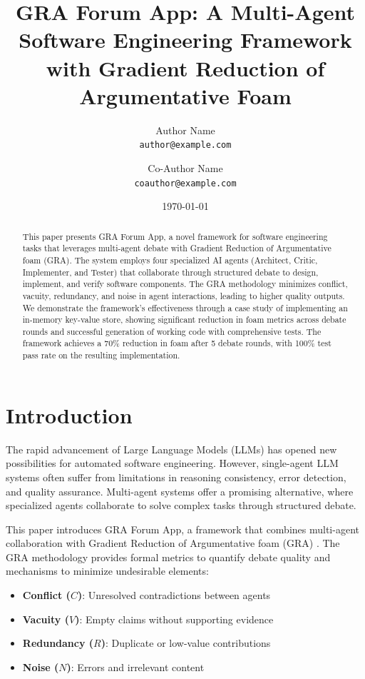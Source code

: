 \documentclass[12pt,a4paper]{article}
\title{GRA Forum App: A Multi-Agent Software Engineering Framework\\ with Gradient Reduction of Argumentative Foam}
\author{
    Author Name \\
    \texttt{author@example.com}
    \and
    Co-Author Name \\
    \texttt{coauthor@example.com}
}
\date{\today}
\begin{document}
\maketitle

\begin{abstract}
This paper presents GRA Forum App, a novel framework for software engineering tasks that leverages multi-agent debate with Gradient Reduction of Argumentative foam (GRA). The system employs four specialized AI agents (Architect, Critic, Implementer, and Tester) that collaborate through structured debate to design, implement, and verify software components. The GRA methodology minimizes conflict, vacuity, redundancy, and noise in agent interactions, leading to higher quality outputs. We demonstrate the framework's effectiveness through a case study of implementing an in-memory key-value store, showing significant reduction in foam metrics across debate rounds and successful generation of working code with comprehensive tests. The framework achieves a 70\% reduction in foam after 5 debate rounds, with 100\% test pass rate on the resulting implementation.
\end{abstract}

\section{Introduction}

The rapid advancement of Large Language Models (LLMs) has opened new possibilities for automated software engineering. However, single-agent LLM systems often suffer from limitations in reasoning consistency, error detection, and quality assurance. Multi-agent systems offer a promising alternative, where specialized agents collaborate to solve complex tasks through structured debate.

This paper introduces GRA Forum App, a framework that combines multi-agent collaboration with Gradient Reduction of Argumentative foam (GRA) \cite{gra-forum}. The GRA methodology provides formal metrics to quantify debate quality and mechanisms to minimize undesirable elements:
\begin{itemize}
    \item \textbf{Conflict ($C$)}: Unresolved contradictions between agents
    \item \textbf{Vacuity ($V$)}: Empty claims without supporting evidence
    \item \textbf{Redundancy ($R$)}: Duplicate or low-value contributions
    \item \textbf{Noise ($N$)}: Errors and irrelevant content
\end{itemize}
\end{document}
